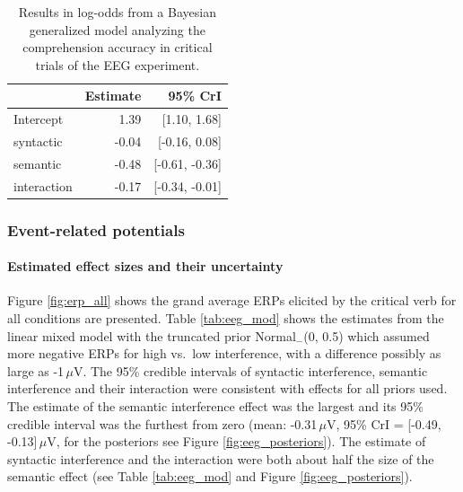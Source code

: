 \documentclass[a4paper, man, floatsintext]{apa7}
\begin{document}
\begin{table}[]
    \caption{Results in log-odds from a Bayesian generalized model analyzing the comprehension accuracy in critical trials of the EEG experiment.}
    \label{tab:eeg_acc_mod}
    \centering
    \begin{tabular}{lrr}
    \toprule
    & Estimate &  95\% CrI  \\
    \midrule
Intercept& 1.39 &   [1.10, 1.68]\\
syntactic& -0.04 &  [-0.16, 0.08]\\
semantic&  -0.48 & [-0.61, -0.36]\\
interaction& -0.17&  [-0.34, -0.01]\\
    \bottomrule
    \end{tabular}
\end{table}

\subsubsection{Event-related potentials}

\paragraph{Estimated effect sizes and their uncertainty}

Figure \ref{fig:erp_all} shows the 
grand average ERPs elicited by the critical verb for all conditions are presented. Table \ref{tab:eeg_mod} shows the estimates from the linear mixed model with the truncated prior Normal$_-$(0, 0.5) which assumed more negative ERPs for high vs.\ low interference, with a difference possibly as large as -1\,$\mu$V. The 95\% credible intervals of syntactic interference, semantic interference and their interaction were consistent with effects for all priors used. The estimate of the semantic interference effect was the largest and its 95\% credible interval was the furthest from zero (mean: -0.31\,$\mu$V, 95\% CrI = [-0.49, -0.13]\,$\mu$V, for the posteriors see Figure \ref{fig:eeg_posteriors}). The estimate of syntactic interference and the interaction were both about half the size of the semantic effect (see Table \ref{tab:eeg_mod} and Figure \ref{fig:eeg_posteriors}).
\end{document}

